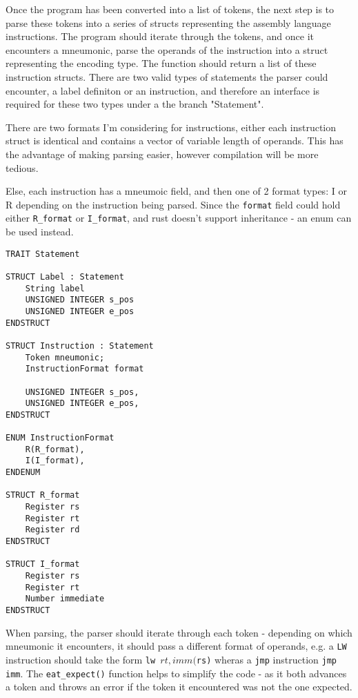 Once the program has been converted into a list of tokens, the next step is to parse these tokens into a series of structs representing the assembly language instructions. The program should iterate through the tokens, and once it encounters a mneumonic, parse the operands of the instruction into a struct representing the encoding type. The function should return a list of these instruction structs. There are two valid types of statements the parser could encounter, a label definiton or an instruction, and therefore an interface is required for these two types under a the branch "Statement".

There are two formats I'm considering for instructions, either each instruction struct is identical and contains a vector of variable length of operands. This has the advantage of making parsing easier, however compilation will be more tedious.

Else, each instruction has a mneumoic field, and then one of 2 format types: I or R depending on the instruction being parsed. Since the \texttt{format} field could hold either \texttt{R\_format} or \texttt{I\_format}, and rust doesn't support inheritance - an enum can be used instead. 

\begin{lstlisting}
TRAIT Statement

STRUCT Label : Statement 
    String label 
    UNSIGNED INTEGER s_pos 
    UNSIGNED INTEGER e_pos 
ENDSTRUCT

STRUCT Instruction : Statement
    Token mneumonic;
    InstructionFormat format

    UNSIGNED INTEGER s_pos, 
    UNSIGNED INTEGER e_pos,
ENDSTRUCT

ENUM InstructionFormat
    R(R_format),
    I(I_format),
ENDENUM
    
STRUCT R_format 
    Register rs
    Register rt
    Register rd
ENDSTRUCT

STRUCT I_format 
    Register rs
    Register rt
    Number immediate
ENDSTRUCT
\end{lstlisting}

When parsing, the parser should iterate through each token - depending on which mneumonic it encounters, it should pass a different format of operands, e.g. a \texttt{LW} instruction should take the form \texttt{lw $rt, imm($rs)} wheras a \texttt{jmp} instruction \texttt{jmp imm}. The \texttt{eat\_expect()} function helps to simplify the code - as it both advances a token and throws an error if the token it encountered was not the one expected.

